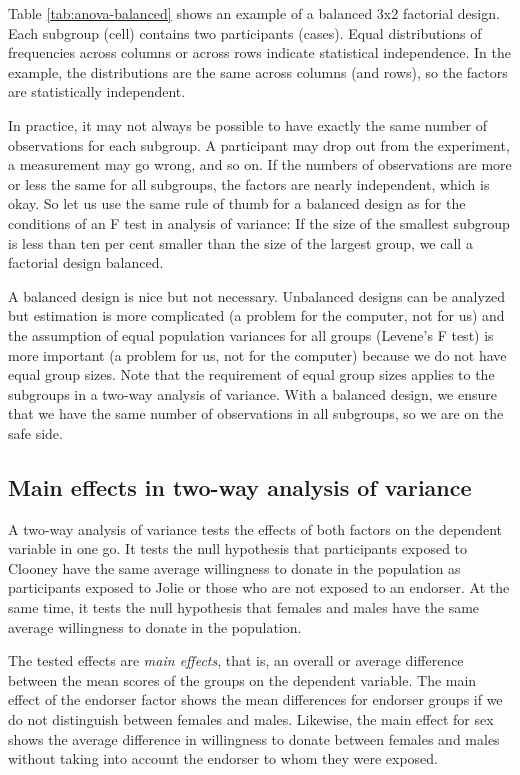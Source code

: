 \documentclass[a4paper]{book}
\theoremstyle{definition}
\theoremstyle{definition}
\theoremstyle{definition}
\theoremstyle{remark}
\begin{document}
Table \ref{tab:anova-balanced} shows an example of a balanced 3x2
factorial design. Each subgroup (cell) contains two participants
(cases). Equal distributions of frequencies across columns or across
rows indicate statistical independence. In the example, the
distributions are the same across columns (and rows), so the factors are
statistically independent.

In practice, it may not always be possible to have exactly the same
number of observations for each subgroup. A participant may drop out
from the experiment, a measurement may go wrong, and so on. If the
numbers of observations are more or less the same for all subgroups, the
factors are nearly independent, which is okay. So let us use the same
rule of thumb for a balanced design as for the conditions of an F test
in analysis of variance: If the size of the smallest subgroup is less
than ten per cent smaller than the size of the largest group, we call a
factorial design balanced.

A balanced design is nice but not necessary. Unbalanced designs can be
analyzed but estimation is more complicated (a problem for the computer,
not for us) and the assumption of equal population variances for all
groups (Levene's F test) is more important (a problem for us, not for
the computer) because we do not have equal group sizes. Note that the
requirement of equal group sizes applies to the subgroups in a two-way
analysis of variance. With a balanced design, we ensure that we have the
same number of observations in all subgroups, so we are on the safe
side.

\subsection{Main effects in two-way analysis of
variance}\label{maineffects}

A two-way analysis of variance tests the effects of both factors on the
dependent variable in one go. It tests the null hypothesis that
participants exposed to Clooney have the same average willingness to
donate in the population as participants exposed to Jolie or those who
are not exposed to an endorser. At the same time, it tests the null
hypothesis that females and males have the same average willingness to
donate in the population.

The tested effects are \emph{main effects}, that is, an overall or
average difference between the mean scores of the groups on the
dependent variable. The main effect of the endorser factor shows the
mean differences for endorser groups if we do not distinguish between
females and males. Likewise, the main effect for sex shows the average
difference in willingness to donate between females and males without
taking into account the endorser to whom they were exposed.
\end{document}
